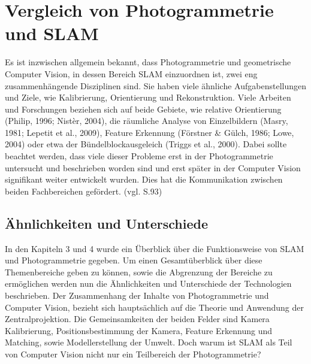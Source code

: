 \chapter{Vergleich von Photogrammetrie und SLAM}

Es ist inzwischen allgemein bekannt, dass Photogrammetrie und geometrische Computer Vision, in dessen Bereich SLAM einzuordnen ist, zwei eng zusammenhängende Disziplinen sind. Sie haben viele ähnliche Aufgabenstellungen und Ziele, wie Kalibrierung, Orientierung und Rekonstruktion. Viele Arbeiten und Forschungen beziehen sich auf beide Gebiete, wie relative Orientierung (Philip, 1996; Nistèr, 2004), die räumliche Analyse von Einzelbildern (Masry, 1981; Lepetit et al., 2009), Feature Erkennung  (Förstner \& Gülch, 1986; Lowe, 2004) oder etwa der Bündelblockausgeleich  (Triggs et al., 2000). Dabei sollte beachtet werden, dass viele dieser Probleme erst in der Photogrammetrie untersucht und beschrieben worden sind und erst später in der Computer Vision signifikant weiter entwickelt wurden. Dies hat die Kommunikation zwischen beiden Fachbereichen gefördert. (vgl. \cite{ph_vs_cv} S.93)


\section{Ähnlichkeiten und Unterschiede}

In den Kapiteln 3 und 4 wurde ein Überblick über die Funktionsweise von SLAM und Photogrammetrie gegeben. Um einen Gesamtüberblick über diese Themenbereiche geben zu können, sowie die Abgrenzung der Bereiche zu ermöglichen werden nun die Ähnlichkeiten und Unterschiede der Technologien beschrieben.
Der Zusammenhang der Inhalte von Photogrammetrie und Computer Vision, bezieht sich hauptsächlich auf die Theorie und Anwendung der Zentralprojektion. Die Gemeinsamkeiten der beiden Felder sind Kamera Kalibrierung, Positionsbestimmung der Kamera, Feature Erkennung und Matching, sowie Modellerstellung der Umwelt. Doch warum ist SLAM als Teil von Computer Vision nicht nur ein Teilbereich der Photogrammetrie?

